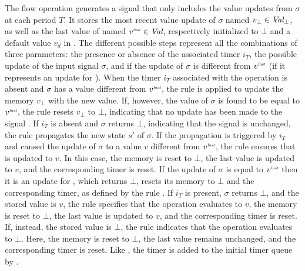 The flow operation  generates a signal that only includes the value updates from
$\sigma$ at each period $T$. It stores the most recent value update of $\sigma$ named
$v_\bot \in \textit{Val}_\bot$, as well as the last value of  named $v^{\textit{\tiny last}} \in \textit{Val}$,
respectively initialized to $\bot$ and a default value $v_d$ in
.
%
The different possible steps represent all the combinations of three parameters: the presence or
absence of the associated timer $i_T$, the possible update of the input signal $\sigma$, and
if the update of $\sigma$ is different from $v^{\textit{\tiny last}}$ (\ie if it represents an update for
).
%
When the timer $i_T$ associated with the  operation is absent and $\sigma$ has a value
different from $v^{\textit{\tiny last}}$, the rule  is
applied to update the memory $v_\bot$ with the new value. If, however, the value of $\sigma$ is
found to be equal to $v^{\textit{\tiny last}}$, the rule 
resets $v_\bot$ to $\bot$, indicating that no update has been made to the signal .
If $i_T$ is absent and $\sigma$ returns $\bot$, indicating that the signal is unchanged, the rule
 propagates the new state $s'$ of $\sigma$.
If the propagation is triggered by $i_T$ and caused the update of $\sigma$ to a value $v$ different
from $v^{\textit{\tiny last}}$, the rule  ensures
that  is updated to $v$. In this case, the memory is reset to $\bot$, the last value
is updated to $v$, and the corresponding timer is reset. If the update of $\sigma$ is equal to
$v^{\textit{\tiny last}}$ then it is an update for , which returns $\bot$, resets its memory to
$\bot$ and the corresponding timer, as defined by the rule
. If $i_T$ is present, $\sigma$ returns
$\bot$, and the stored value is $v$, the rule
 specifies that the operation evaluates to
$v$, the memory is reset to $\bot$, the last value is updated to $v$, and the corresponding timer is
reset. If, instead, the stored value is $\bot$, the rule
 indicates that the operation evaluates to
$\bot$. Here, the memory is reset to $\bot$, the last value remains unchanged, and the corresponding
timer is reset.
%
Like , the timer is added to the initial timer queue by .

